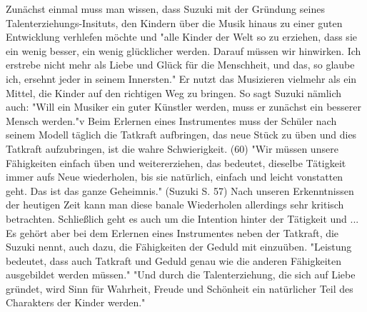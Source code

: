 Zunächst einmal muss man wissen, dass Suzuki mit der Gründung seines
Talenterziehungs-Insituts, den Kindern über die Musik hinaus zu einer guten
Entwicklung verhlefen möchte und "alle Kinder der Welt so zu
erziehen, dass sie ein wenig besser, ein wenig glücklicher werden. Darauf müssen wir hinwirken. Ich
erstrebe nicht mehr als Liebe und Glück für die Menschheit, und das, so glaube
ich, ersehnt jeder in seinem Innersten."
\autocite[103]{suzuki:erziehung_ist_liebe}
Er nutzt das Musizieren vielmehr als ein Mittel, die Kinder auf den richtigen
Weg zu bringen. So sagt Suzuki nämlich auch: "Will ein Musiker ein guter Künstler werden, muss er zunächst ein besserer
Mensch werden."v\autocite[103]{suzuki:erziehung_ist_liebe}
Beim Erlernen eines Instrumentes muss der Schüler nach seinem Modell täglich die Tatkraft
aufbringen, das neue Stück zu üben und dies Tatkraft aufzubringen, ist die wahre
Schwierigkeit. (60)
"Wir müssen unsere Fähigkeiten einfach üben und weitererziehen, das bedeutet,
dieselbe Tätigkeit immer aufs Neue wiederholen, bis sie natürlich, einfach und
leicht vonstatten geht. Das ist das ganze Geheimnis." (Suzuki S. 57)
Nach unseren Erkenntnissen der heutigen Zeit kann man diese banale Wiederholen
allerdings sehr kritisch betrachten. Schließlich geht es auch um die Intention
hinter der Tätigkeit und ...
Es gehört aber bei dem Erlernen eines Instrumentes neben der Tatkraft,
die Suzuki nennt, auch dazu, die Fähigkeiten der Geduld mit einzuüben. "Leistung bedeutet, dass auch Tatkraft und Geduld genau wie die anderen
Fähigkeiten ausgebildet werden müssen."
\autocite[60]{suzuki:erziehung_ist_liebe}
"Und durch die Talenterziehung, die
sich auf Liebe gründet, wird Sinn für Wahrheit, Freude und Schönheit ein
natürlicher Teil des Charakters der Kinder werden." \autocite[75]{suzuki:erziehung_ist_liebe}

